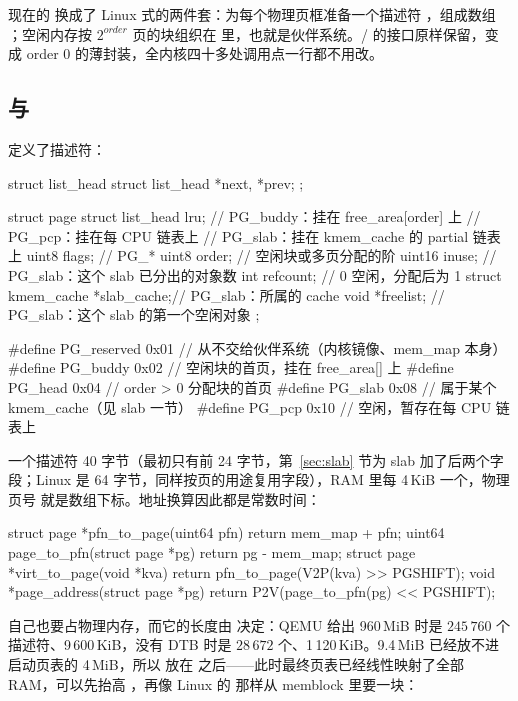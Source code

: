 现在的  换成了 Linux 式的两件套：为每个物理页框准备一个描述符 ，组成数组 ；空闲内存按 $2^{order}$ 页的块组织在  里，也就是伙伴系统。/ 的接口原样保留，变成 order 0 的薄封装，全内核四十多处调用点一行都不用改。

\subsection{ 与 }

 定义了描述符：

\begin{ccode}
struct list_head {
  struct list_head *next, *prev;
};

struct page {
  struct list_head lru;         // PG_buddy：挂在 free_area[order] 上
                                // PG_pcp：挂在每 CPU 链表上
                                // PG_slab：挂在 kmem_cache 的 partial 链表上
  uint8  flags;                 // PG_*
  uint8  order;                 // 空闲块或多页分配的阶
  uint16 inuse;                 // PG_slab：这个 slab 已分出的对象数
  int    refcount;              // 0 空闲，分配后为 1
  struct kmem_cache *slab_cache;// PG_slab：所属的 cache
  void  *freelist;              // PG_slab：这个 slab 的第一个空闲对象
};

#define PG_reserved 0x01        // 从不交给伙伴系统（内核镜像、mem_map 本身）
#define PG_buddy    0x02        // 空闲块的首页，挂在 free_area[] 上
#define PG_head     0x04        // order > 0 分配块的首页
#define PG_slab     0x08        // 属于某个 kmem_cache（见 slab 一节）
#define PG_pcp      0x10        // 空闲，暂存在每 CPU 链表上
\end{ccode}

一个描述符 40 字节（最初只有前 24 字节，第~\ref{sec:slab} 节为 slab 加了后两个字段；Linux 是 64 字节，同样按页的用途复用字段），RAM 里每 4\,KiB 一个，物理页号  就是数组下标。地址换算因此都是常数时间：

\begin{ccode}
struct page *pfn_to_page(uint64 pfn) { return mem_map + pfn; }
uint64 page_to_pfn(struct page *pg)  { return pg - mem_map; }
struct page *virt_to_page(void *kva) { return pfn_to_page(V2P(kva) >> PGSHIFT); }
void *page_address(struct page *pg)  { return P2V(page_to_pfn(pg) << PGSHIFT); }
\end{ccode}

 自己也要占物理内存，而它的长度由  决定：QEMU 给出 960\,MiB 时是 $245\,760$ 个描述符、9\,600\,KiB，没有 DTB 时是 $28\,672$ 个、1\,120\,KiB。9.4\,MiB 已经放不进启动页表的 4\,MiB，所以  放在  之后——此时最终页表已经线性映射了全部 RAM，可以先抬高 ，再像 Linux 的  那样从 memblock 里要一块：

